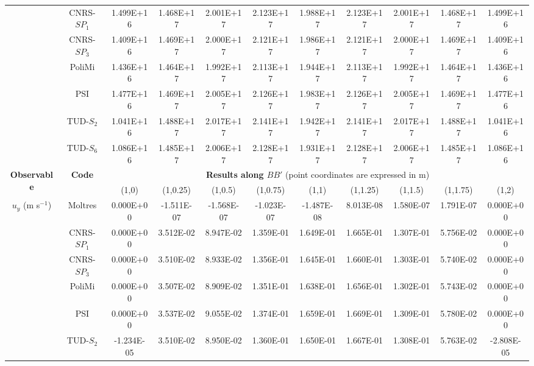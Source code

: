 \begin{table}[htbp!]
\begin{tabular}{c c c c c c c c c c c}
        & CNRS-$SP_1$  &   1.499E+16 &   1.468E+17 &   2.001E+17 &   2.123E+17 &   1.988E+17 &   2.123E+17 &   2.001E+17 &   1.468E+17 &   1.499E+16 \\
        & CNRS-$SP_3$  &   1.409E+16 &   1.469E+17 &   2.000E+17 &   2.121E+17 &   1.986E+17 &   2.121E+17 &   2.000E+17 &   1.469E+17 &   1.409E+16 \\
        & PoliMi    &   1.436E+16 &   1.464E+17 &   1.992E+17 &   2.113E+17 &   1.944E+17 &   2.113E+17 &   1.992E+17 &   1.464E+17 &   1.436E+16 \\
        & PSI       &   1.477E+16 &   1.469E+17 &   2.005E+17 &   2.126E+17 &   1.983E+17 &   2.126E+17 &   2.005E+17 &   1.469E+17 &   1.477E+16 \\
        & TUD-$S_2$    &   1.041E+16 &   1.488E+17 &   2.017E+17 &   2.141E+17 &   1.942E+17 &   2.141E+17 &   2.017E+17 &   1.488E+17 &   1.041E+16 \\
        & TUD-$S_6$    &   1.086E+16 &   1.485E+17 &   2.006E+17 &   2.128E+17 &   1.931E+17 &   2.128E+17 &   2.006E+17 &   1.485E+17 &   1.086E+16 \\
        \midrule
        \midrule
        \multirow{2}{*}{\textbf{Observable}} & \multirow{2}{*}{\textbf{Code}} & \multicolumn{9}{c}{\textbf{Results along $BB'$} (point coordinates are expressed in m)} \\
		& & {(1,0)} & {(1,0.25)} & {(1,0.5)} & {(1,0.75)} & {(1,1)} & {(1,1.25)} & {(1,1.5)} & {(1,1.75)} & {(1,2)} \\
		\midrule
        \multirow{7}{*}{$u_y$ (m s$^{-1}$)} & Moltres    &   0.000E+00 &  -1.511E-07 &  -1.568E-07 &  -1.023E-07 &  -1.487E-08 &   8.013E-08 &   1.580E-07 &   1.791E-07 &   0.000E+00 \\
        & CNRS-$SP_1$   &   0.000E+00 &   3.512E-02 &   8.947E-02 &   1.359E-01 &   1.649E-01 &   1.665E-01 &   1.307E-01 &   5.756E-02 &   0.000E+00 \\
        & CNRS-$SP_3$   &   0.000E+00 &   3.510E-02 &   8.933E-02 &   1.356E-01 &   1.645E-01 &   1.660E-01 &   1.303E-01 &   5.740E-02 &   0.000E+00 \\
    & PoliMi     &   0.000E+00 &   3.507E-02 &   8.909E-02 &   1.351E-01 &   1.638E-01 &   1.656E-01 &   1.302E-01 &   5.743E-02 &   0.000E+00 \\
        & PSI        &   0.000E+00 &   3.537E-02 &   9.055E-02 &   1.374E-01 &   1.659E-01 &   1.669E-01 &   1.309E-01 &   5.780E-02 &   0.000E+00 \\
        & TUD-$S_2$     &  -1.234E-05 &   3.510E-02 &   8.950E-02 &   1.360E-01 &   1.650E-01 &   1.667E-01 &   1.308E-01 &   5.763E-02 &  -2.808E-05 \\

\end{tabular}
\end{table}
